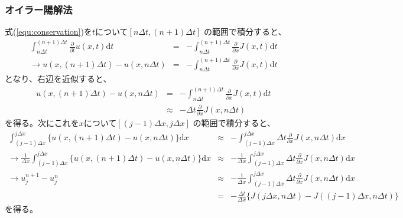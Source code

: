 \documentclass[a4j, titlepage]{jsarticle}
\numberwithin{equation}{section}
\begin{document}
        \subsubsection{オイラー陽解法}
            式(\ref{equ:conservation})を$t$について$[n\Delta t, (n + 1)\Delta t]$
            の範囲で積分すると、
            \begin{eqnarray*}
                \int_{n\Delta t}^{(n + 1)\Delta t}\frac{\partial}{\partial t}u(x, t) \mathrm{d}t &=& -\int_{n\Delta t}^{(n + 1)\Delta t}\frac{\partial}{\partial x}J(x, t) \mathrm{d}t \\
                \rightarrow u(x, (n + 1)\Delta t) - u(x, n\Delta t) &=& -\int_{n\Delta t}^{(n + 1)\Delta t}\frac{\partial}{\partial x}J(x, t) \mathrm{d}t
            \end{eqnarray*}
            となり、右辺を近似すると、
            \begin{eqnarray}
                u(x, (n + 1)\Delta t) - u(x, n\Delta t) &=& -\int_{n\Delta t}^{(n + 1)\Delta t}\frac{\partial}{\partial x}J(x, t) \mathrm{d}t \nonumber \\
                &\approx& -\Delta t\frac{\partial}{\partial x}J(x, n\Delta t) \label{equ:approx}
            \end{eqnarray}
            を得る。次にこれを$x$について$[(j - 1)\Delta x, j\Delta x]$
            の範囲で積分すると、
            \begin{eqnarray}
                \int_{(j - 1)\Delta x}^{j\Delta x}\{u(x, (n + 1)\Delta t) - u(x, n\Delta t)\} \mathrm{d}x &\approx& -\int_{(j - 1)\Delta x}^{j\Delta x}\Delta t\frac{\partial}{\partial x}J(x, n\Delta t) \mathrm{d}x \nonumber \\
                \rightarrow \frac{1}{\Delta x}\int_{(j - 1)\Delta x}^{j\Delta x}\{u(x, (n + 1)\Delta t) - u(x, n\Delta t)\} \mathrm{d}x &\approx& -\frac{1}{\Delta x}\int_{(j - 1)\Delta x}^{j\Delta x}\Delta t\frac{\partial}{\partial x}J(x, n\Delta t) \mathrm{d}x \nonumber \\
                \rightarrow u_j^{n + 1} - u_j^n &\approx& -\frac{1}{\Delta x}\int_{(j - 1)\Delta x}^{j\Delta x}\Delta t\frac{\partial}{\partial x}J(x, n\Delta t) \mathrm{d}x \nonumber \\
                &=& -\frac{\Delta t}{\Delta x}\{J(j\Delta x, n\Delta t) - J((j - 1)\Delta x, n\Delta t)\} \label{equ:4}
            \end{eqnarray}
            を得る。
\end{document}
